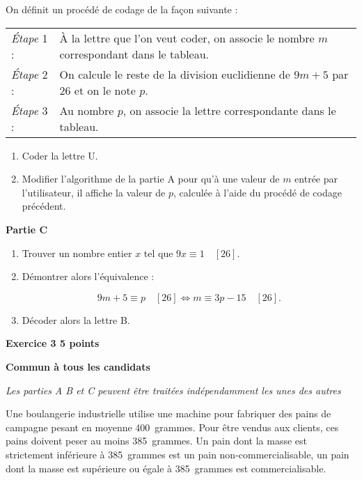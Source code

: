 \documentclass[10pt]{article}
\begin{document}
\medskip 

On définit un procédé de codage de la façon suivante :
 
\hspace{0,5cm}\begin{tabular}{l p{9.5cm}}
\emph{Étape} 1 :& 	À la lettre que l'on veut coder, on associe le nombre $m$ correspondant dans le tableau.\\ 
\emph{Étape} 2 :& 	On calcule le reste de la division euclidienne\index{division euclidienne} de $9m + 5$ par $26$ et on le note $p$.\\
\emph{Étape} 3 :& 	Au nombre $p$, on associe la lettre correspondante dans le tableau.\\
\end{tabular}

\medskip
 
\begin{enumerate}
\item Coder la lettre U. 
\item Modifier l'algorithme de la partie A pour qu'à une valeur de $m$ entrée par l'utilisateur, il affiche la valeur de $p$, calculée à l'aide du procédé de codage précédent.
\end{enumerate}
 
\bigskip

\textbf{Partie C}

\medskip
 
\begin{enumerate}
\item Trouver un nombre entier $x$ tel que $9x \equiv 1\quad [26]$. 
\item Démontrer alors l'équivalence : 

\[9m + 5 \equiv  p\quad [26] \iff m \equiv  3p -  15\quad  [26].\]
 
\item Décoder alors la lettre B. 
\end{enumerate}

\vspace{0,5cm}

\textbf{Exercice 3 \hfill  5 points}

\textbf{Commun à tous les candidats}

\begin{center}
\emph{Les parties A B et C peuvent être traitées indépendamment les unes des autres}\end{center}
 
Une boulangerie industrielle utilise une machine pour fabriquer des pains de campagne pesant en moyenne 400~grammes. Pour être vendus aux clients, ces pains doivent peser au moins 385~grammes. Un pain dont la masse est strictement inférieure à 385~grammes est un pain non-commercialisable, un pain dont la masse est supérieure ou égale à 385~grammes est commercialisable.
 
\end{document}
